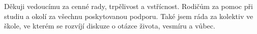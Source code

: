 \startAcknowledgement
Děkuji vedoucímu za cenné rady, trpělivost a vstřícnost. Rodičům za pomoc při studiu a okolí za všechnu poskytovanou podporu. Také jsem ráda za kolektiv ve škole, ve kterém se rozvíjí diskuze o otázce života, vesmíru a vůbec.
\stopAcknowledgement

\endinput
